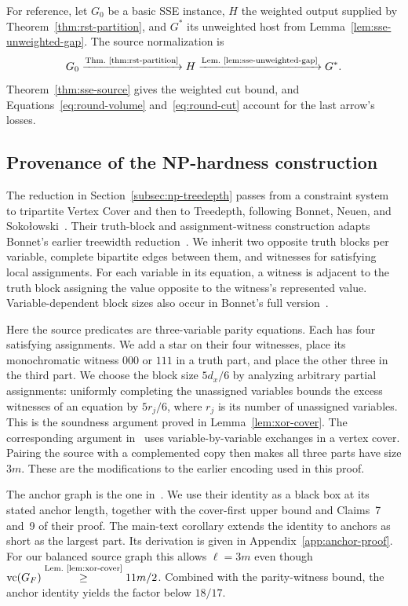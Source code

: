 For reference, let $G_0$ be a basic SSE instance, $H$ the weighted
output supplied by Theorem~\ref{thm:rst-partition}, and $G^*$ its
unweighted host from Lemma~\ref{lem:sse-unweighted-gap}.
The source normalization is
\[
 G_0
 \xrightarrow{\text{Thm.~\ref{thm:rst-partition}}}
 H
 \xrightarrow{\text{Lem.~\ref{lem:sse-unweighted-gap}}}
 G^*.
\]
Theorem~\ref{thm:sse-source} gives the weighted cut bound, and
Equations~\eqref{eq:round-volume} and~\eqref{eq:round-cut} account
for the last arrow's losses.

\subsection{Provenance of the NP-hardness construction}
\label{subsec:np-provenance}

The reduction in Section~\ref{subsec:np-treedepth} passes from a constraint
system to tripartite Vertex Cover and then to Treedepth, following
Bonnet, Neuen, and Soko\l owski~\cite[Sections~3 and~4]{BNS}. Their
truth-block and assignment-witness construction adapts Bonnet's earlier
treewidth reduction~\cite[full version, Section~3.1]{BonnetTreewidth}.
We inherit two opposite truth blocks per variable, complete bipartite
edges between them, and witnesses for satisfying local assignments.
For each variable in its equation, a witness is adjacent to the truth
block assigning the value opposite to the witness's represented value.
Variable-dependent block
sizes also occur in Bonnet's full version~\cite[Section~3.5]{BonnetTreewidth}.

Here the source predicates are three-variable parity equations. Each
has four satisfying assignments. We add a star on their four
witnesses, place its monochromatic witness $000$ or $111$ in a truth
part, and place the other three in the third part. We choose the block
size $5d_x/6$ by analyzing arbitrary partial assignments: uniformly
completing the unassigned variables bounds the excess witnesses of an
equation by $5r_j/6$, where $r_j$ is its number of unassigned variables.
This is the soundness argument proved in Lemma~\ref{lem:xor-cover}.
The corresponding argument in~\cite[proof of Lemma~10]{BNS} uses
variable-by-variable exchanges in a vertex cover.
Pairing the source with a complemented copy then makes all three
parts have size $3m$. These are the modifications to the earlier
encoding used in this proof.

The anchor graph is the one in~\cite[Lemma~6]{BNS}. We use their
identity as a black box at its stated anchor length, together
with the cover-first upper bound and Claims~7 and~9 of their proof.
The main-text corollary extends the identity to anchors as short
as the largest part. Its derivation is given in
Appendix~\ref{app:anchor-proof}. For our balanced source graph this
allows $\ell=3m$ even though
$\operatorname{vc}(G_F)\overset{\text{Lem.~\ref{lem:xor-cover}}}{\geq}11m/2$. Combined with the
parity-witness bound, the anchor identity yields the factor below
$18/17$.

